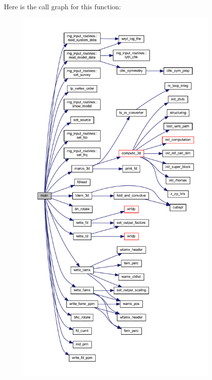 Here is the call graph for this function\+:
\nopagebreak
\begin{figure}[H]
\begin{center}
\leavevmode
\includegraphics[height=550pt]{Marco_8f90_a8ec2266d83cd6c0b762cbcbc92c0af3d_cgraph}
\end{center}
\end{figure}
\mbox{\label{Marco_8f90_a399bcda7d08fa780bc7a58673659436b}} 
